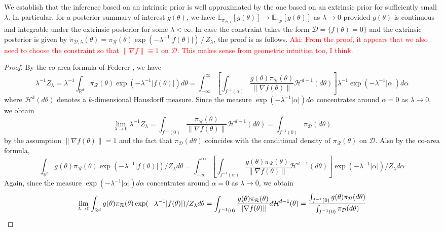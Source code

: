 \documentclass[10pt]{article}
\newcommand{\aki}[1]{\textcolor{red}{Aki: #1}}
\newcommand{\mc}[1]{\mathcal{#1}}
\DeclareMathOperator{\1}{\mathbbm{1}}
\begin{document}
\newcommand{\tilpi}{\tilde{\pi}}

We establish that the inference based on an intrinsic prior is well approximated by the one based on an extrinsic prior for sufficiently small $\lambda$. In particular, for a posterior summary of interest $g(\theta)$, we have $\mathbb{E}_{\tilpi_{\mc D, \lambda}}[g(\theta)] \to \mathbb{E}_{\pi_{\mc D}}[g(\theta)]$ as $\lambda \to 0$ provided $g(\theta)$ is continuous and integrable under the extrinsic posterior for some $\lambda < \infty$. In case the constraint takes the form $\mc D = \{f(\theta) = 0\}$ and the extrinsic posterior is given by $\tilpi_{\mc D, \lambda}(\theta) = \pi_{\mc R}(\theta) \exp(- \lambda^{-1} |f(\theta)|) \, / \, Z_\lambda$, the proof is as follows. \aki{From the proof, it appears that we also need to choose the constraint so that  $\| \nabla f \| \equiv 1$ on $\mc D$. This makes sense from geometric intuition too, I think.}
\begin{proof}[Proof]
	By the co-area formula of Federer \citep{diaconis2013manifold}, we have
	\begin{equation}
	\lambda^{-1} Z_\lambda
	= \lambda^{-1} \int_{\mathbb{R}^d} \pi_{\mc R}(\theta) \exp(- \lambda^{-1} |f(\theta)|)  d \theta
	= \int_{-\infty}^{\infty}  \left[ \int_{f^{-1}(\alpha)} \frac{ g(\theta) \pi_{\mc R}(\theta) }{ \| \nabla f(\theta) \| } \mathcal{H}^{d-1}(d \theta) \right]  \lambda^{-1} \exp(- \lambda^{-1} |\alpha| ) d \alpha
	\end{equation}
	where $\mathcal{H}^{k}(d \theta)$ denotes a $k$-dimensional Hausdorff measure. Since the measure $\exp(- \lambda^{-1} |\alpha| ) d \alpha$ concentrates around $\alpha = 0$ as $\lambda \to 0$, we obtain
	\begin{equation}
	\lim_{\lambda \to 0} \lambda^{-1} Z_\lambda
	= \int_{f^{-1}(0)} \frac{ \pi_{\mc R}(\theta) }{ \| \nabla f(\theta) \| } \mathcal{H}^{d-1}(d \theta) 
	= \int_{f^{-1}(0)} \pi_{\mc D}(d \theta)
	\end{equation}
	by the assumption $\| \nabla f(\theta) \|  = 1$ and the fact that $\pi_{\mc D}(d \theta)$ coincides with the conditional density of $\pi_{\mc R}(\theta)$ on $\mc D$. Also by the co-area formula,
	\begin{equation}
	\int_{\mathbb{R}^d} g(\theta) \pi_{\mc R}(\theta) \exp(- \lambda^{-1} |f(\theta)|)  /  Z_\lambda d \theta
	= \int_{-\infty}^{\infty}  \left[ \int_{f^{-1}(\alpha)} \frac{ g(\theta) \pi_{\mc R}(\theta) }{ \| \nabla f(\theta) \| } \mathcal{H}^{d-1}(d \theta) \right]  \exp(- \lambda^{-1} |\alpha| )  /  Z_\lambda d \alpha
	\end{equation}
	Again, since the measure $\exp(- \lambda^{-1} |\alpha| ) d \alpha$ concentrates around $\alpha = 0$ as $\lambda \to 0$, we obtain
	\begin{equation}
	\lim_{\lambda \to 0} \int_{\mathbb{R}^d} g(\theta) \pi_{\mc R}(\theta) \exp(- \lambda^{-1} |f(\theta)|)  /  Z_\lambda d \theta
	= \int_{f^{-1}(0)} \frac{ g(\theta) \pi_{\mc R}(\theta) }{ \| \nabla f(\theta) \| } d \mathcal{H}^{d-1}(\theta) 
	= \frac{\int_{f^{-1}(0)} g(\theta) \pi_{\mc D}(d \theta)}{\int_{f^{-1}(0)} \pi_{\mc D}(d \theta)} \qedhere
	\end{equation}
\end{proof}
\end{document}
